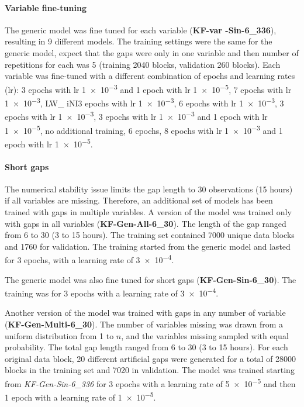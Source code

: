 \documentclass{article}
\begin{document}
\paragraph{Variable fine-tuning} The generic model was fine tuned for each variable (\textbf{KF-\textlangle var \textrangle-Sin-6\_336}), resulting in 9 different models. The training settings were the same for the generic model, expect that the gaps were only in one variable and then number of repetitions for each was 5 (training 2040 blocks, validation 260 blocks). Each variable was fine-tuned with a different combination of epochs and learning rates (lr):  3 epochs with lr \num{1e-3} and 1 epoch with lr \num{1e-5},  \num{7} epochs with lr \num{1e-3}, LW\_ iNI\num{3} epochs with lr \num{1e-3},  \num{6} epochs with lr \num{1e-3},  \num{3} epochs with lr \num{1e-3},  \num{3} epochs with lr \num{1e-3} and 1 epoch with lr \num{1e-5},  no additional training,  \num{6} epochs,  \num{8} epochs with lr \num{1e-3} and 1 epoch with lr \num{1e-5}.

\paragraph{Short gaps} The numerical stability issue limits the gap length to 30 observations (15 hours) if all variables are missing. Therefore, an additional set of models has been trained with gaps in multiple variables.  
A version of the model was trained only with gaps in all variables (\textbf{KF-Gen-All-6\_30}). The length of the gap ranged from 6 to 30 (3 to 15 hours). The training set contained 7000 unique data blocks and 1760 for validation. The training started from the generic model and lasted for 3 epochs, with a learning rate of \num{3e-4}. 

The generic model was also fine tuned for short gaps (\textbf{KF-Gen-Sin-6\_30}). The training was for 3 epochs with a learning rate of \num{3e-4}.

Another version of the model was trained with gaps in any number of variable (\textbf{KF-Gen-Multi-6\_30}). The number of variables missing was drawn from a uniform distribution  from 1 to $n$, and the variables missing sampled with equal probability. The total gap length ranged from 6 to 30 (3 to 15 hours). For each original data block, 20 different artificial gaps were generated for a total of 28000 blocks in the training set and 7020 in validation. The model was trained starting from \textit{KF-Gen-Sin-6\_336} for 3 epochs with a learning rate of \num{5e-5} and then 1 epoch with a learning rate of \num{1e-5}.
\end{document}
